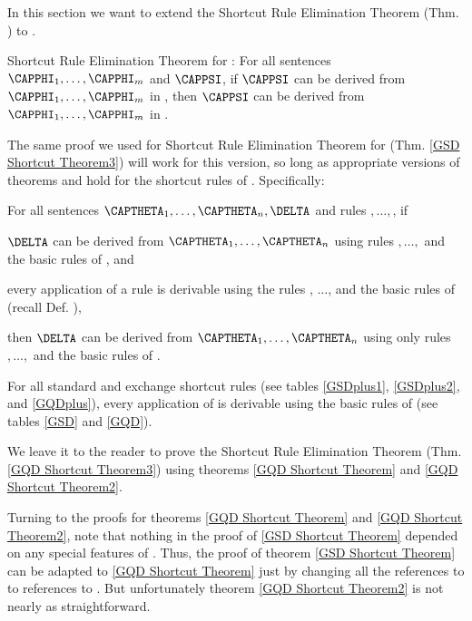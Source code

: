 In this section we want to extend the Shortcut Rule Elimination Theorem (Thm. ) to \GQD{}.
\begin{THEOREM}{ Shortcut Rule Elimination Theorem for \GQDP{}:}
For all \GQL{} sentences $\CAPPHI_1,\ldots,\CAPPHI_{\integer{m}}$ and $\CAPPSI$, if $\CAPPSI$ can be derived from $\CAPPHI_1,\ldots,\CAPPHI_{\integer{m}}$ in \GQDP{}, then $\CAPPSI$ can be derived from $\CAPPHI_1,\ldots,\CAPPHI_{\integer{m}}$ in \GQD{}.
\end{THEOREM}
\noindent{}The same proof we used for Shortcut Rule Elimination Theorem for \GSD{} (Thm. \ref{GSD Shortcut Theorem3}) will work for this version, so long as appropriate versions of theorems  and  hold for the shortcut rules of \GQD{}.
Specifically:
\begin{THEOREM}{}
For all \GQL{} sentences $\CAPTHETA_1,\ldots,\CAPTHETA_{\integer{n}},\DELTA$ and rules $,\ldots,$, if
\begin{cenumerate}
\item $\DELTA$ can be derived from $\CAPTHETA_1,\ldots,\CAPTHETA_{\integer{n}}$ using rules $,\ldots,$ and the basic rules of \GSD{}, and
\item every application of a rule  is derivable using the rules , $\ldots$,  and the basic rules of \GQD{} (recall Def. ),
\end{cenumerate}
then $\DELTA$ can be derived from $\CAPTHETA_1,\ldots,\CAPTHETA_{\integer{n}}$ using only rules $,\ldots,$ and the basic rules of \GQD{}.
\end{THEOREM}
\begin{THEOREM}{}
For all standard and exchange shortcut rules  (see tables \ref{GSDplus1}, \ref{GSDplus2}, and \ref{GQDplus}), every application of  is derivable using the basic rules of \GQD{} (see tables \ref{GSD} and \ref{GQD}).
\end{THEOREM}
\noindent{}We leave it to the reader to prove the Shortcut Rule Elimination Theorem (Thm. \ref{GQD Shortcut Theorem3}) using theorems \ref{GQD Shortcut Theorem} and \ref{GQD Shortcut Theorem2}.

Turning to the proofs for theorems \ref{GQD Shortcut Theorem} and \ref{GQD Shortcut Theorem2}, note that nothing in the proof of \ref{GSD Shortcut Theorem} depended on any special features of \GSD{}. 
Thus, the proof of theorem \ref{GSD Shortcut Theorem} can be adapted to \ref{GQD Shortcut Theorem} just by changing all the references to \GSD{} to references to \GQD{}. 
But unfortunately theorem \ref{GQD Shortcut Theorem2} is not nearly as straightforward.  

